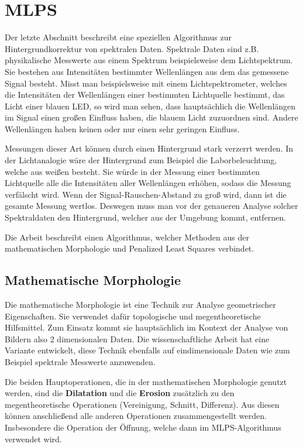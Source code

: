 \documentclass{article}
\begin{document}
\section{MLPS}

Der letzte Abschnitt beschreibt eine speziellen Algorithmus zur Hintergrundkorrektur von spektralen Daten.
Spektrale Daten sind z.B. physikalische Messwerte aus einem Spektrum beispielsweise dem Lichtspektrum. 
Sie bestehen aus Intensitäten bestimmter Wellenlängen aus dem das gemessene Signal besteht. 
Misst man beispielsweise mit einem Lichtspektrometer, welches die Intensitäten der Wellenlängen einer bestimmten Lichtquelle bestimmt, das Licht einer blauen LED,
so wird man sehen, dass hauptsächlich die Wellenlängen im Signal einen großen Einfluss haben, die blauem Licht zuzuordnen sind. Andere Wellenlängen haben keinen oder nur einen sehr geringen Einfluss.

Messungen dieser Art können durch einen Hintergrund stark verzerrt werden. In der Lichtanalogie wäre der Hintergrund zum Beispiel die Laborbeleuchtung, welche aus weißen besteht. 
Sie würde in der Messung einer bestimmten Lichtquelle alle die Intensitäten aller Wellenlängen erhöhen, sodass die Messung verfälscht wird.
Wenn der Signal-Rauschen-Abstand zu groß wird, dann ist die gesamte Messung wertlos. Deswegen muss man vor der genaueren Analyse solcher Spektraldaten den Hintergrund, welcher aus der Umgebung kommt, entfernen.

Die Arbeit beschreibt einen Algorithmus, welcher Methoden aus der mathematischen Morphologie und Penalized Least Squares verbindet.

\subsection{Mathematische Morphologie}
Die mathematische Morphologie ist eine Technik zur Analyse geometrischer Eigenschaften.
Sie verwendet dafür topologische und megentheoretische Hilfsmittel. Zum Einsatz kommt sie hauptsächlich im Kontext der Analyse von Bildern also 2 dimensionalen Daten.
Die wissenschaftliche Arbeit hat eine Variante entwickelt, diese Technik ebenfalls auf eindimensionale Daten wie zum Beispiel spektrale Messwerte anzuwenden.

Die beiden Hauptoperationen, die in der mathematischen Morphologie genutzt werden, sind die \textbf{Dilatation} und die \textbf{Erosion} zusätzlich zu den megentheoretische Operationen (Vereinigung, Schnitt, Differenz).
Aus diesen können anschließend alle anderen Operationen zusammengestellt werden. Insbesondere die Operation der Öffnung, welche dann im MLPS-Algorithmus verwendet wird.
\end{document}
